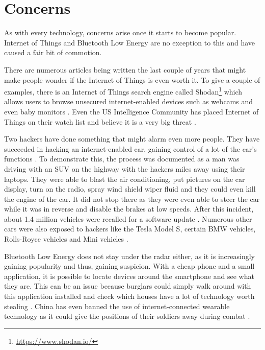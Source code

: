 \documentclass[pdftex,a4paper,12pt,twoside]{report}
\begin{document}
\section{Concerns}
\label{sec:concerns}

As with every technology, concerns arise once it starts to become popular. Internet of Things and Bluetooth Low Energy are no exception to this and have caused a fair bit of commotion.

There are numerous articles being written the last couple of years that might make people wonder if the Internet of Things is even worth it. To give a couple of examples, there is an Internet of Things search engine called Shodan\footnote{\url{https://www.shodan.io/}} which allows users to browse unsecured internet-enabled devices such as webcams and even baby monitors \citep{porup20162, stanislav2015}. Even the US Intelligence Community has placed Internet of Things on their watch list and believe it is a very big threat \citep{clapper2016}.

Two hackers have done something that might alarm even more people. They have succeeded in hacking an internet-enabled car, gaining control of a lot of the car's functions \citep{greenberg2015}. To demonstrate this, the process was documented as a man was driving with an SUV on the highway with the hackers miles away using their laptops. They were able to blast the air conditioning, put pictures on the car display, turn on the radio, spray wind shield wiper fluid and they could even kill the engine of the car. It did not stop there as they were even able to steer the car while it was in reverse and disable the brakes at low speeds. After this incident, about 1.4 million vehicles were recalled for a software update \citep{kessler2015}. Numerous other cars were also exposed to hackers like the Tesla Model S, certain BMW vehicles, Rolls-Royce vehicles and Mini vehicles \citep{hirsch2015}.

Bluetooth Low Energy does not stay under the radar either, as it is increasingly gaining popularity and thus, gaining suspicion. With a cheap phone and a small application, it is possible to locate devices around the smartphone and see what they are. This can be an issue because burglars could simply walk around with this application installed and check which houses have a lot of technology worth stealing \citep{ashford2015}. China has even banned the use of internet-connected wearable technology as it could give the positions of their soldiers away during combat \citep{bbcnews2015}.
\end{document}
